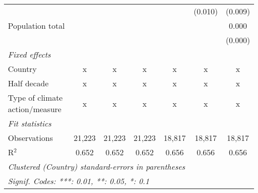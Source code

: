 \begin{tabular}{lcccccc}
                                                           &         &                &                &               & (0.010)       & (0.009)\\   
   Population total                                        &         &                &                &               &               & 0.000\\   
                                                           &         &                &                &               &               & (0.000)\\   
   \emph{Fixed effects}\\
   Country                                                 & x       & x              & x              & x             & x             & x\\  
   Half decade                                             & x       & x              & x              & x             & x             & x\\  
   Type of climate action/measure                          & x       & x              & x              & x             & x             & x\\  
   \midrule \emph{Fit statistics}\\
   Observations                                            & 21,223  & 21,223         & 21,223         & 18,817        & 18,817        & 18,817\\  
   R$^2$                                                   & 0.652   & 0.652          & 0.652          & 0.656         & 0.656         & 0.656\\  
   \midrule
   \multicolumn{7}{l}{\emph{Clustered (Country) standard-errors in parentheses}}\\
   \multicolumn{7}{l}{\emph{Signif. Codes: ***: 0.01, **: 0.05, *: 0.1}}\\
\end{tabular}
\par\endgroup


